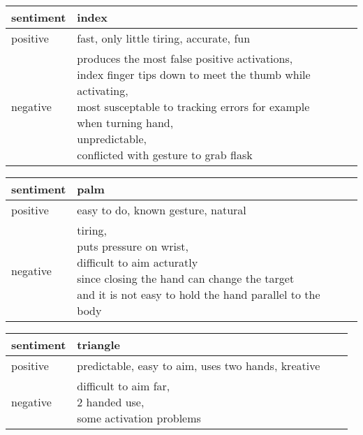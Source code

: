 \begin{table}[]
\begin{tabular}{llll}
\hline
sentiment &
    index \\ \hline
\multicolumn{1}{|l|}{positive} &
    \multicolumn{1}{l|}{fast, only little tiring, accurate, fun} \\ \hline
negative &
    \makecell{produces the most false positive activations, \\index finger tips down to meet the thumb while activating, \\most susceptable to tracking errors for example when turning hand, \\unpredictable, \\conflicted with gesture to grab flask} \\ \hline
\end{tabular}%
\label{tbl:interview1}
\end{table}

\begin{table}[]
\begin{tabular}{llll}
\hline
sentiment &
    palm \\ \hline
\multicolumn{1}{|l|}{positive} &
    \multicolumn{1}{l|}{easy to do, known gesture, natural} \\ \hline
negative &
    \makecell{tiring,\\ puts pressure on wrist,\\ difficult to aim acturatly \\ since closing the hand can change the target\\ and it is not easy to hold the hand parallel to the body} \\ \hline
\end{tabular}%
\label{tbl:interview2}
\end{table}

\begin{table}[]
\begin{tabular}{llll}
\hline
sentiment &
    triangle \\ \hline
\multicolumn{1}{|l|}{positive} &
    \multicolumn{1}{l|}{predictable, easy to aim, uses two hands, kreative} \\ \hline
negative &
    \makecell{difficult to aim far,\\ 2 handed use,\\ some activation problems} \\ \hline
\end{tabular}%
\label{tbl:interview3}
\end{table}

